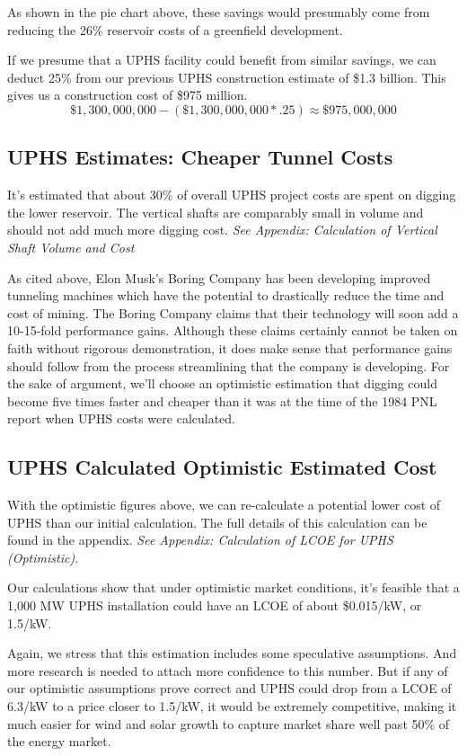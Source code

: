 \documentclass[hidelinks,12pt,a4paper]{article}
\begin{document}
As shown in the pie chart above, these savings would presumably come from reducing the 26\% reservoir costs of a greenfield development.

If we presume that a UPHS facility could benefit from similar savings, we can deduct 25\% from our previous UPHS construction estimate of \$1.3 billion. This gives us a construction cost of \$975 million.
\[ \$1,300,000,000 - (\$1,300,000,000 * .25) \approx \$975,000,000\]

\subsection{UPHS Estimates: Cheaper Tunnel Costs}
It's estimated that about 30\% of overall UPHS project costs are spent on digging the lower reservoir. The vertical shafts are comparably small in volume and should not add much more digging cost. \textit{See Appendix: Calculation of Vertical Shaft Volume and Cost}

As cited above, Elon Musk's Boring Company has been developing improved tunneling machines which have the potential to drastically reduce the time and cost of mining. The Boring Company claims that their technology will soon add a 10-15-fold performance gains. Although these claims certainly cannot be taken on faith without rigorous demonstration, it does make sense that performance gains should follow from the process streamlining that the company is developing. For the sake of argument, we'll choose an optimistic estimation that digging could become five times faster and cheaper than it was at the time of the 1984 PNL report when UPHS costs were calculated.

\subsection{UPHS Calculated Optimistic Estimated Cost}
With the optimistic figures above, we can re-calculate a potential lower cost of UPHS than our initial calculation. The full details of this calculation can be found in the appendix. \textit{See Appendix: Calculation of LCOE for UPHS (Optimistic)}.

\begin{displayquote}
Our calculations show that under optimistic market conditions, it's feasible that a 1,000 MW UPHS installation could have an LCOE of about \$0.015/kW, or 1.5\cent /kW.
\end{displayquote}

Again, we stress that this estimation includes some speculative assumptions. And more research is needed to attach more confidence to this number. But if any of our optimistic assumptions prove correct and UPHS could drop from a LCOE of 6.3\cent /kW to a price closer to 1.5\cent /kW, it would be extremely competitive, making it much easier for wind and solar growth to capture market share well past 50\% of the energy market.
\end{document}
